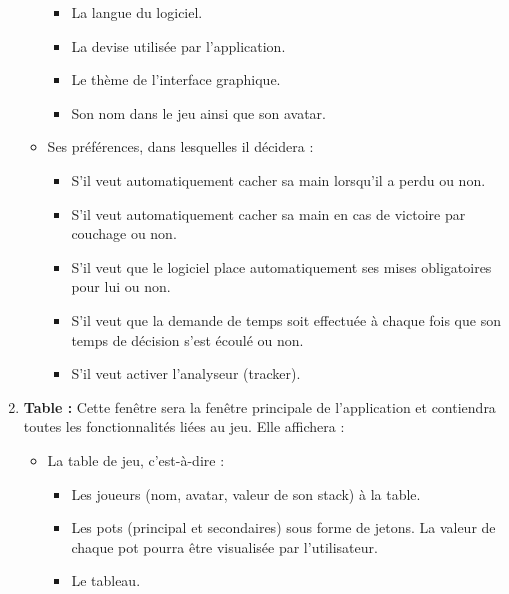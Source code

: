 \begin{enumerate}
\begin{itemize}
			\begin{itemize}
				\item La langue du logiciel.
				\item La devise utilisée par l'application.
				\item Le thème de l'interface graphique.
				\item Son nom dans le jeu ainsi que son avatar.
			\end{itemize}

			\item Ses préférences, dans lesquelles il décidera :
			
			\begin{itemize}
				\item S'il veut automatiquement cacher sa main lorsqu'il a perdu
				       ou non.
				\item S'il veut automatiquement cacher sa main en cas de victoire
				      par couchage ou non.
				\item S'il veut que le logiciel place automatiquement ses mises 
				      obligatoires pour lui ou non.
				\item S'il veut que la demande de temps soit effectuée à chaque 
				      fois que son temps de décision s'est écoulé ou non.
				\item S'il veut activer l'analyseur (tracker).
			\end{itemize}
			
		\end{itemize}
		
		\item \textbf{Table :} Cette fenêtre sera la fenêtre principale de 
		      l'application et contiendra toutes les fonctionnalités liées au 
		      jeu. Elle affichera : 
		
		\begin{itemize}
			\item La table de jeu, c'est-à-dire : 
			
			\begin{itemize}
				\item Les joueurs (nom, avatar, valeur de son stack) à la table.
				\item Les pots (principal et secondaires) sous forme de jetons. 
				      La valeur de chaque pot pourra être visualisée par 
				      l'utilisateur.
				\item Le tableau.
			\end{itemize}
			

\end{itemize}
\end{enumerate}
